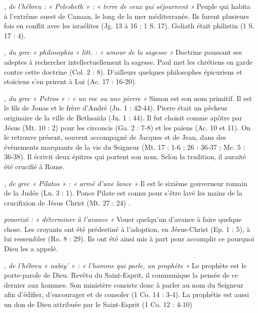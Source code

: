 \begin{multicols}{2}
\textit{, de l'hébreu : « Pelesheth » : « terre de ceux qui séjournent »}\newline
Peuple qui habita à l'extrême ouest de Canaan, le long de la mer méditerranée. Ils furent plusieurs fois en conflit avec les israélites (Jg. 13 à 16 ; 1 S. 17). Goliath était philistin (1 S. 17 : 4).

\textit{, du grec « philosophia » litt. : « amour de la sagesse »}\newline
Doctrine poussant ses adeptes à rechercher intellectuellement la sagesse. Paul met les chrétiens en garde contre cette doctrine (Col. 2 : 8). D'ailleurs quelques philosophes épicuriens et stoïciens s'en prirent à Lui (Ac. 17 : 16-20).

\textit{, du grec « Petros » : « un roc ou une pierre »}\newline
Simon est son nom primitif. Il est le fils de Jonas et le frère d'André (Jn. 1 : 42-44). Pierre était un pêcheur originaire de la ville de Bethsaïda (Jn. 1 : 44). Il fut choisit comme apôtre par Jésus (Mt. 10 : 2) pour les circoncis (Ga. 2 : 7-8) et les païens (Ac. 10 et 11). On le retrouve présent, souvent accompagné de Jacques et de Jean, dans des évènements marquants de la vie du Seigneur (Mt. 17 : 1-6 ; 26 : 36-37 ; Mc. 5 : 36-38). Il écrivit deux épitres qui portent son nom. Selon la tradition, il auraité été crucifié à Rome.

\textit{, de grec « Pilatos » : « armé d'une lance »}\newline
Il est le sixième gouverneur romain de la Judée (Lu. 3 : 1). Ponce Pilate est connu pour s'être lavé les mains de la crucifixion de Jésus Christ (Mt. 27 : 24) .

\textit{proorizô : « déterminer à l'avance »}\newline
Vouer quelqu’un d'avance à faire quelque chose. Les croyants ont été prédestiné à l'adoption, en Jésus-Christ (Ep. 1 : 5), à lui ressembler (Ro. 8 : 29). Ils ont été ainsi mis à part pour accomplir ce pourquoi Dieu les a appelé.

\textit{, de l'hébreu « nabiy' » : « l'homme qui parle, un prophète »}\newline
Le prophète est le porte-parole de Dieu. Revêtu du Saint-Esprit, il communique la pensée de ce dernier aux hommes.
Son ministère consiste donc à parler au nom du Seigneur afin d'édifier, d'encourager et de consoler (1 Co. 14 : 3-4).
La prophétie est aussi un don de Dieu attribuée par le Saint-Esprit (1 Co. 12 : 4-10)


\end{multicols}
